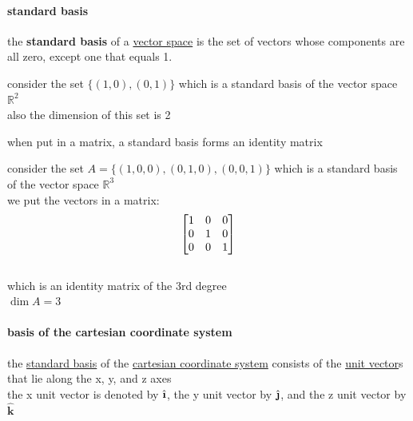 \documentclass[a4paper,12pt]{article}
\newcommand{\ihat}{\hat{\textbf{\i}}}
\newcommand{\jhat}{\hat{\textbf{\j}}}
\newcommand{\khat}{\hat{\textbf{k}}}
\begin{document}
\paragraph{standard basis}
\label{sec:orgf759dd0}
\begin{definition}
the \textbf{standard basis} of a \hyperref[sec:orgea93933]{vector space} is the set of vectors whose components are all zero, except one that equals 1.\\

\begin{my_example}
consider the set \(\{(1,0),(0,1)\}\) which is a standard basis of the vector space \(\mathbb{R}^2\)\\
also the dimension of this set is 2\\
\end{my_example}

\begin{lemma}
when put in a matrix, a standard basis forms an identity matrix\\

\begin{my_example}
consider the set \(A = \{(1,0,0),(0,1,0),(0,0,1)\}\) which is a standard basis of the vector space \(\mathbb{R}^3\)\\
we put the vectors in a matrix:\\
\[
\bmqty{1 & 0 & 0\\ 0 & 1 & 0\\ 0 & 0 & 1}
\]\\
which is an identity matrix of the 3rd degree\\
\(\dim A = 3\)\\
\end{my_example}
\end{lemma}
\end{definition}
\paragraph{basis of the cartesian coordinate system}
\label{sec:org6f7d0d9}
the \hyperref[sec:orgf759dd0]{standard basis} of the \href{20220929001304-cartesian_coordinate_system.org}{cartesian coordinate system} consists of the \hyperref[sec:orgc00677a]{unit vector}s that lie along the x, y, and z axes\\
the x unit vector is denoted by \(\ihat\), the y unit vector by \(\jhat\), and the z unit vector by \(\khat\)\\
\begin{center}

\end{center}
\end{document}
